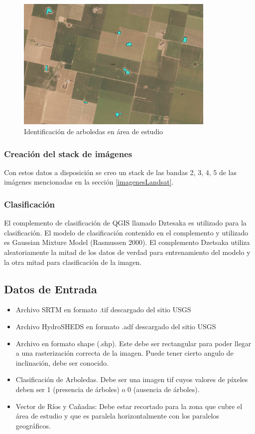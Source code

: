 \documentclass[10pt,a4paper, twoside]{report}
\begin{document}
\begin{figure}[!htb]
   \centering      
   \includegraphics[width=0.85\textwidth]{imagenes/ShapesArboles.jpg}
 \caption{Identificación de arboledas en área de estudio}
 \label{ShapeArboles}
\end{figure}

\subsubsection{Creación del stack de imágenes}

Con estos datos a disposición se creo un stack de las bandas 2, 3, 4, 5 de las imágenes mencionadas en la sección \ref{imagenesLandsat}.

\subsubsection{Clasificación}

El complemento de clasificación de QGIS llamado Dztesaka \cite{dzetsaka} es utilizado para la clasificación. El modelo de clasificación contenido en el complemento y utilizado es Gaussian Mixture Model (Rasmussen 2000). El complemento Dzetsaka utiliza aleatoriamente la mitad de los datos de verdad para entrenamiento del modelo y la otra mitad para clasificación de la imagen.


\subsection{Datos de Entrada}

\begin{itemize}
\item Archivo SRTM en formato .tif descargado del sitio USGS
\item Archivo HydroSHEDS en formato .adf descargado del sitio USGS
\item Archivo en formato shape (.shp). Este debe ser rectangular para poder llegar a una rasterización correcta de la imagen. Puede tener cierto angulo de inclinación, debe ser conocido.
\item Clasificación de Arboledas. Debe ser una imagen tif cuyos valores de píxeles deben ser 1 (presencia de árboles) o 0 (ausencia de árboles).
\item Vector de Ríos y Cañadas: Debe estar recortado para la zona que cubre el área de estudio y que es paralela horizontalmente con los paralelos geográficos.
\end{itemize}
\end{document}
